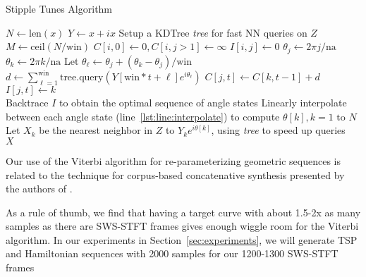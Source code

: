 \documentclass[runningheads]{llncs}
\begin{document}
\algrenewcommand\algorithmicindent{0.8em}%
\begin{algorithm}
  \caption{Stipple Tunes Algorithm}

  \begin{algorithmic}[1]
     
    \State $N \gets \text{len}(x)$ 
    \State $Y \gets x + ix$
    \State Setup a KDTree {\em tree} for fast NN queries on $Z$
    \State $M \gets \text{ceil}(N / \text{win})$
    \State $C[i, 0] \gets 0, C[i, j > 1] \gets \infty$ 
    \State $I[i, j] \gets 0$ 
            \State $\theta_j \gets 2 \pi j / \text{na}$
                \State $\theta_k \gets 2 \pi k / \text{na}$ \label{lst:line:interpolate}
                \State Let $\theta_{\ell} \gets \theta_j + (\theta_k-\theta_j)/\text{win}$ 
                \State $d \gets \sum_{\ell = 1}^{\text{win}} \text{tree.query}(Y[\text{win}*t + \ell] e^{i \theta_{\ell}})$ 
                    \State $C[j, t] \gets C[k, t-1] + d$ 
                    \State $I[j, t] \gets k$  
                \EndIf
            \EndFor
        \EndFor
    \EndFor \\
    \State Backtrace $I$ to obtain the optimal sequence of angle states
    \State Linearly interpolate between each angle state (line~\ref{lst:line:interpolate}) to compute $\theta[k], k = 1 \text{ to } N$ 
    \State Let $X_k$ be the nearest neighbor in $Z$ to $Y_k e^{i \theta[k]}$, using {\em tree} to speed up queries \\
    \Return $X$
    \EndProcedure
  \end{algorithmic}
  \label{alg:stippletunes}
\end{algorithm}



Our use of the Viterbi algorithm for re-parameterizing geometric sequences is related to the technique for corpus-based concatenative synthesis presented by the authors of \cite{schwarz2007corpus}.


As a rule of thumb, we find that having a target curve with about 1.5-2x as many samples as there are SWS-STFT frames gives enough wiggle room for the Viterbi algorithm.  In our experiments in Section~\ref{sec:experiments}, we will generate TSP and Hamiltonian sequences with 2000 samples for our 1200-1300 SWS-STFT frames
\end{document}
